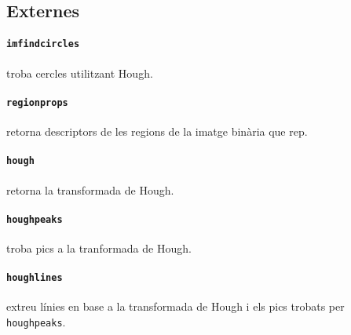\subsection{Externes}

\paragraph{\texttt{imfindcircles}} troba cercles utilitzant Hough.

\paragraph{\texttt{regionprops}} retorna descriptors de les regions de la
imatge binària que rep.

\paragraph{\texttt{hough}} retorna la transformada de Hough.

\paragraph{\texttt{houghpeaks}} troba pics a la tranformada de Hough.

\paragraph{\texttt{houghlines}} extreu línies en base a la transformada de Hough i els
pics trobats per \texttt{houghpeaks}.